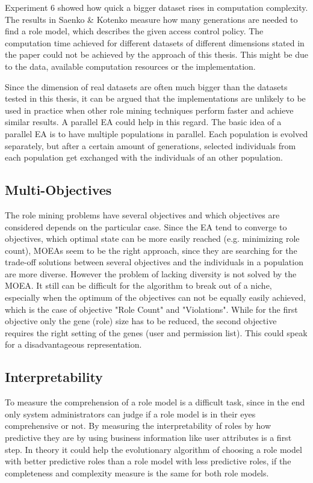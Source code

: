 	Experiment 6 showed how quick a bigger dataset rises in computation complexity. The results in Saenko \& Kotenko\cite{saenko2012design} measure how many generations are needed to find a role model, which describes the given access control policy. The computation time achieved for different datasets of different dimensions stated in the paper could not be achieved by the approach of this thesis. This might be due to the data, available computation resources or the implementation.
	
	Since the dimension of real datasets are often much bigger than the datasets tested in this thesis, it can be argued that the implementations are unlikely to be used in practice when other role mining techniques perform faster and achieve similar results. A parallel EA could help in this regard. The basic idea of a parallel EA is to have multiple populations in parallel. Each population is evolved separately, but after a certain amount of generations, selected individuals from each population get exchanged with the individuals of an other population.\cite{Eiben}
	
\subsection*{Multi-Objectives}
	The role mining problems have several objectives and which objectives are considered depends on the particular case. Since the EA tend to converge to objectives, which optimal state can be more easily reached (e.g. minimizing role count), MOEAs seem to be the right approach, since they are searching for the trade-off solutions between several objectives and the individuals in a population are more diverse. However the problem of lacking diversity is not solved by the MOEA. It still can be difficult for the algorithm to break out of a niche, especially when the optimum of the objectives can not be equally easily achieved, which is the case of objective "Role Count" and "Violations". While for the first objective only the gene (role) size has to be reduced, the second objective requires the right setting of the genes (user and permission list). This could speak for a disadvantageous representation.
	
\subsection*{Interpretability}
	To measure the comprehension of a role model is a difficult task, since in the end only system administrators can judge if a role model is in their eyes comprehensive or not. By measuring the interpretability of roles by how predictive they are by using business information like user attributes is a first step. In theory it could help the evolutionary algorithm of choosing a role model with better predictive roles than a role model with less predictive roles, if the completeness and complexity measure is the same for both role models. 	
	
